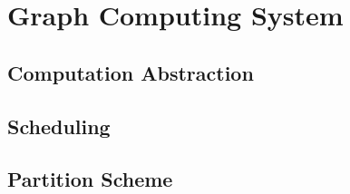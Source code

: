 \section{Graph Computing System}
\subsection{Computation Abstraction}
\subsection{Scheduling}
\subsection{Partition Scheme}
